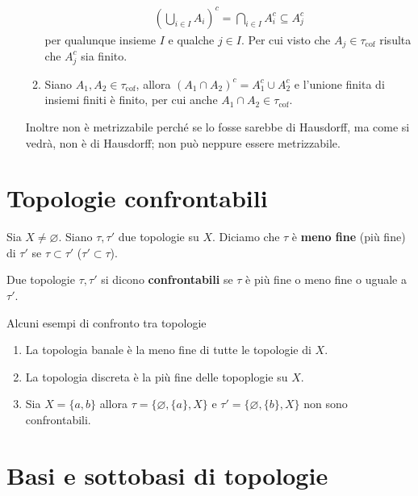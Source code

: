 \begin{example}
\begin{enumerate}
\begin{enumerate}
\begin{equation}
				\begin{aligned}	
					\left(\bigcup_{i \in I} A_i\right)^c = \bigcap_{i \in I} A^c_i \subseteq A^c_j
				\end{aligned}
			\end{equation}
		per qualunque insieme $I$ e qualche $j \in I$. Per cui visto che $A_j \in \tau_{\text{cof}}$ risulta che $A^c_j$ sia finito.
		\item Siano $A_1, A_2 \in \tau_{\text{cof}}$, allora $(A_1 \cap A_2)^c = A^c_1 \cup A^c_2$ e l'unione finita di insiemi finiti è finito, per cui anche $A_1 \cap A_2 \in \tau_{\text{cof}}$. 
	\end{enumerate}	
	Inoltre non è metrizzabile perché se lo fosse sarebbe di Hausdorff, ma come si vedrà, non è di Hausdorff; non può neppure essere metrizzabile.
\end{enumerate}
\end{example}

\section{Topologie confrontabili}

\begin{definition}
	Sia $X \neq \varnothing$. Siano $\tau, \tau'$ due topologie su $X$. Diciamo che $\tau$ è \textbf{meno fine} (più fine) di $\tau'$ se $\tau \subset \tau'$ ($\tau' \subset \tau$).
\end{definition}

\begin{definition}
	Due topologie $\tau, \tau'$ si dicono \textbf{confrontabili} se $\tau$ è più fine o meno fine o uguale a $\tau'$.
\end{definition}

\begin{example}
	Alcuni esempi di confronto tra topologie
	\begin{enumerate}
		\item La topologia banale è la meno fine di tutte le topologie di $X$.
		\item La topologia discreta è la più fine delle topoplogie su $X$.
		\item Sia $X = \{a,b\}$ allora $\tau = \{\varnothing,\{a\}, X\}$ e $\tau' = \{\varnothing, \{b\}, X\}$ non sono confrontabili.
	\end{enumerate}
\end{example}


\section{Basi e sottobasi di topologie}

